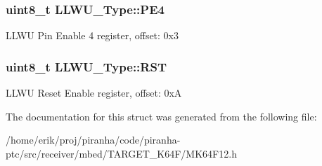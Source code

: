\subsubsection[{\texorpdfstring{P\+E4}{PE4}}]{ uint8\+\_\+t L\+L\+W\+U\+\_\+\+Type\+::\+P\+E4}\hypertarget{structLLWU__Type_a3e7dd04bfade7dc646336a69827f8d8f}{}\label{structLLWU__Type_a3e7dd04bfade7dc646336a69827f8d8f}
L\+L\+WU Pin Enable 4 register, offset\+: 0x3 
\subsubsection[{\texorpdfstring{R\+ST}{RST}}]{ uint8\+\_\+t L\+L\+W\+U\+\_\+\+Type\+::\+R\+ST}\hypertarget{structLLWU__Type_ace78cf7cc590f959ee7485ef82661ab3}{}\label{structLLWU__Type_ace78cf7cc590f959ee7485ef82661ab3}
L\+L\+WU Reset Enable register, offset\+: 0xA 

The documentation for this struct was generated from the following file\+:\begin{DoxyCompactItemize}
\item 
/home/erik/proj/piranha/code/piranha-\/ptc/src/receiver/mbed/\+T\+A\+R\+G\+E\+T\+\_\+\+K64\+F/M\+K64\+F12.\+h\end{DoxyCompactItemize}
